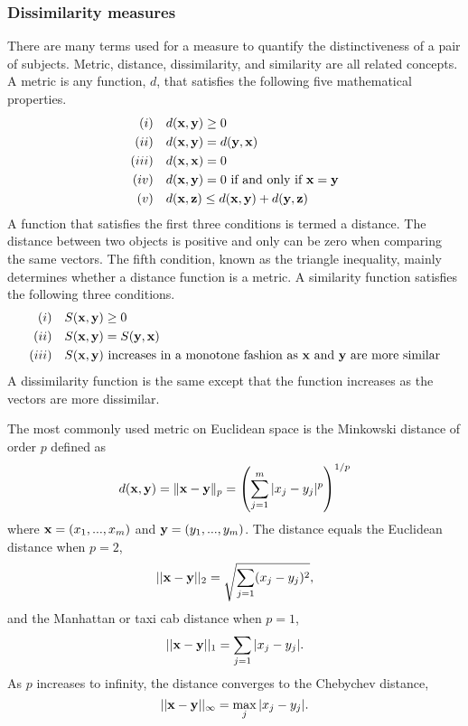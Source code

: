 \subsubsection{Dissimilarity measures}
There are many terms used for a measure to quantify the distinctiveness of a pair of subjects. Metric, distance, dissimilarity, and similarity are all related concepts. A metric is any function, $d$, that satisfies the following five mathematical properties.
\begin{align*}
(i)& \quad d(\mathbf x,\mathbf y)\geq 0 \\
(ii)& \quad d(\mathbf x,\mathbf y) = d(\mathbf y,\mathbf x)\\
(iii)&\quad d(\mathbf x,\mathbf x) = 0\\
(iv)&\quad d(\mathbf x,\mathbf y) = 0\text{ if and only if } \mathbf x=\mathbf y\\
(v)&\quad d(\mathbf x,\mathbf z) \leq d(\mathbf x,\mathbf y) + d(\mathbf y,\mathbf z)
\end{align*}
A function that satisfies the first three conditions is termed a distance. The distance between two objects is positive and only can be zero when comparing the same vectors. The fifth condition, known as the triangle inequality, mainly determines whether a distance function is a metric. A similarity function satisfies the following three conditions.
\begin{align*}
(i)&\quad S(\mathbf x,\mathbf y)\geq 0 \\
(ii)&\quad S(\mathbf x,\mathbf y) = S(\mathbf y,\mathbf x)\\
(iii)& \quad S(\mathbf x,\mathbf y)\text{ increases in a monotone fashion as }\mathbf x\text{ and }\mathbf y\text{ are more similar}
\end{align*}
A dissimilarity function is the same except that the function increases as the vectors are more dissimilar. 

The most commonly used metric on Euclidean space is the Minkowski distance of order $p$ defined as
$$d(\mathbf x,\mathbf y) = \|\mathbf x - \mathbf y\|_{p} = \left(\sum^{m}_{j=1}|x_{j}-y_{j}|^{p}\right)^{1/p}$$
where $\mathbf x = (x_{1},...,x_{m})$ and $\mathbf y = (y_{1},...,y_{m})$. The distance equals the Euclidean distance when $p=2$,
$$||\mathbf x - \mathbf y||_{2}=\sqrt{\sum_{j=1}(x_{j}-y_{j})^{2}},$$
and the Manhattan or taxi cab distance when $p=1$,
$$||\mathbf x - \mathbf y||_{1}=\sum_{j=1}|x_{j}-y_{j}|.$$
As $p$ increases to infinity, the distance converges to the Chebychev distance,
$$||\mathbf x - \mathbf y||_{\infty}=\max_{j}|x_{j}-y_{j}|.$$

